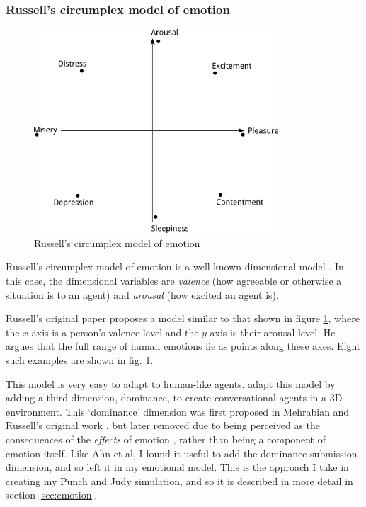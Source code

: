 \subsubsection{Russell's circumplex model of emotion}\label{sec:circumplex}
\begin{figure}[!t]
\centerline{\includegraphics[height=3in]{circumplex.png}}
\caption{Russell's circumplex model of emotion} \label{fig:circumplex}
\end{figure}

Russell's circumplex model of emotion is a well-known dimensional model \citep{russell1980circumplex}. In this case, the dimensional variables are \emph{valence} (how agreeable or otherwise a situation is to an agent) and \emph{arousal} (how excited an agent is).

Russell's original paper proposes a model similar to that shown in figure \ref{fig:circumplex}, where the $x$ axis is a person's valence level and the $y$ axis is their arousal level. He argues that the full range of human emotions lie as points along these axes. Eight such examples are shown in fig. \ref{fig:circumplex}.

This model is very easy to adapt to human-like agents. \citet{ahn2012nvc} adapt this model by adding a third dimension, dominance, to create conversational agents in a 3D environment. This `dominance' dimension was first proposed in Mehrabian and Russell's original work \citep{mehrabian1974approach}, but later removed due to being perceived as the consequences of the \emph{effects\/} of emotion \citep{russell1980circumplex}, rather than being a component of emotion itself. Like Ahn et al, I found it useful to add the dominance-submission dimension, and so left it in my emotional model. This is the approach I take in creating my Punch and Judy simulation, and so it is described in more detail in section \ref{sec:emotion}.


